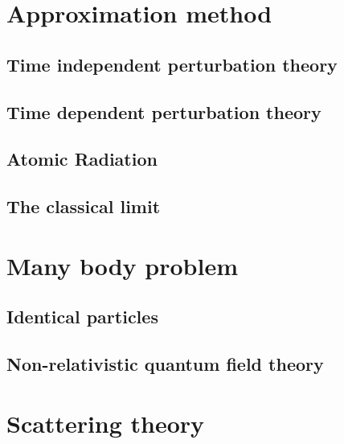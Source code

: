 \documentclass[cyan]{elegantnote}
\begin{document}
\chapter{Approximation method}
\section{Time independent perturbation theory}
\section{Time dependent perturbation theory}
\section{Atomic Radiation}
\section{The classical limit}

\chapter{Many body problem}
\section{Identical particles}
\section{Non-relativistic quantum field theory}

\chapter{Scattering theory}
\end{document}
